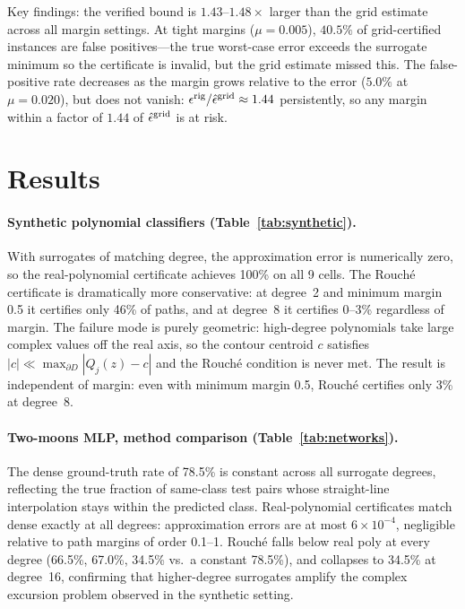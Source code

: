\documentclass{article}
\theoremstyle{definition}
\begin{document}
Key findings: the verified bound is $1.43$--$1.48\times$ larger than the grid
estimate across all margin settings.  At tight margins ($\mu=0.005$), $40.5\%$
of grid-certified instances are false positives---the true worst-case error
exceeds the surrogate minimum so the certificate is invalid, but the grid
estimate missed this.  The false-positive rate decreases as the margin grows
relative to the error ($5.0\%$ at $\mu=0.020$), but does not vanish:
$\epsilon^{\rm rig}/\hat\epsilon^{\rm grid} \approx 1.44$ persistently, so
any margin within a factor of $1.44$ of $\hat\epsilon^{\rm grid}$ is at risk.

\section{Results}
\label{sec:results}

\paragraph{Synthetic polynomial classifiers (Table~\ref{tab:synthetic}).}
With surrogates of matching degree, the approximation error is numerically
zero, so the real-polynomial certificate achieves 100\% on all 9 cells.
The Rouch\'e certificate is dramatically more conservative: at degree~2 and
minimum margin 0.5 it certifies only 46\% of paths, and at degree~8 it
certifies 0--3\% regardless of margin.  The failure mode is purely geometric:
high-degree polynomials take large complex values off the real axis, so the
contour centroid $c$ satisfies $|c| \ll \max_{\partial D}|Q_j(z)-c|$ and the
Rouch\'e condition is never met.  The result is independent of margin: even
with minimum margin 0.5, Rouché certifies only 3\% at degree~8.

\paragraph{Two-moons MLP, method comparison (Table~\ref{tab:networks}).}
The dense ground-truth rate of 78.5\% is constant across all surrogate
degrees, reflecting the true fraction of same-class test pairs whose
straight-line interpolation stays within the predicted class.
Real-polynomial certificates match dense exactly at all degrees:
approximation errors are at most $6\times10^{-4}$, negligible relative to
path margins of order 0.1--1.  Rouché falls below real poly at every degree
(66.5\%, 67.0\%, 34.5\% vs.\ a constant 78.5\%), and collapses to 34.5\% at degree~16,
confirming that higher-degree surrogates amplify the complex excursion
problem observed in the synthetic setting.
\end{document}
